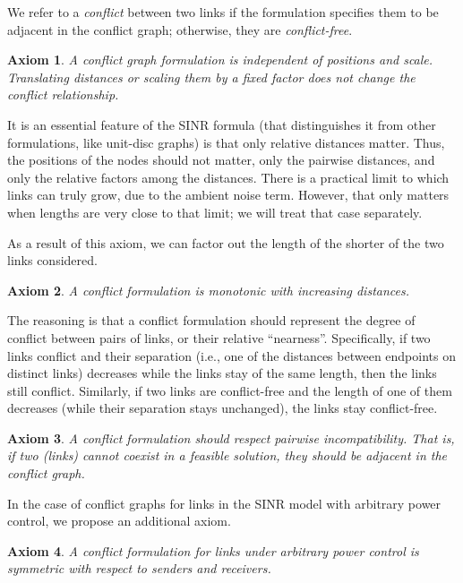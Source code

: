 \documentclass[11pt]{article}
\newtheorem{axiom}{Axiom}
\begin{document}
We refer to a \emph{conflict} between two links if the formulation specifies them to be adjacent in the
conflict graph; otherwise, they are \emph{conflict-free}.

\begin{axiom}
A conflict graph formulation is \emph{independent of positions and scale}. 
Translating distances or scaling them by a fixed factor does not change the conflict relationship.
\label{axiom:scale-free}
\end{axiom}

It is an essential feature of the SINR formula (that distinguishes it from other formulations, like unit-disc graphs) 
is that only relative distances matter.  Thus, the positions of
the nodes should not matter, only the pairwise distances, and only the relative factors among the
distances.  There is a practical limit to which links can truly grow, due to the ambient noise term.  However, that
only matters when lengths are very close to that limit; we will treat that case separately.

As a result of this axiom, we can factor out the length of the shorter of the two links considered.

\begin{axiom}
A conflict formulation is \emph{monotonic} with increasing distances.
\label{axiom:monotonicity}
\end{axiom}

The reasoning is that a conflict formulation should represent the degree of conflict between pairs of
links, or their relative ``nearness''.  Specifically, if two links conflict and their separation (i.e.,
one of the distances between endpoints on distinct links) decreases while the links stay of the same
length, then the links still conflict.  Similarly, if two links are conflict-free and the length of one
of them decreases (while their separation stays unchanged), the links stay conflict-free.

\begin{axiom}
A conflict formulation should respect pairwise incompatibility. That is, 
if two (links) cannot coexist in a feasible solution, they should be adjacent in the conflict graph.
\label{axiom:incompatible-pair}
\end{axiom}

\smallskip

In the case of conflict graphs for links in the SINR model with arbitrary power control, we propose an
additional axiom.

\begin{axiom}
  A conflict formulation for links under arbitrary power control is
  symmetric with respect to senders and receivers.
\label{axiom:symmetry}
\end{axiom}
\end{document}
